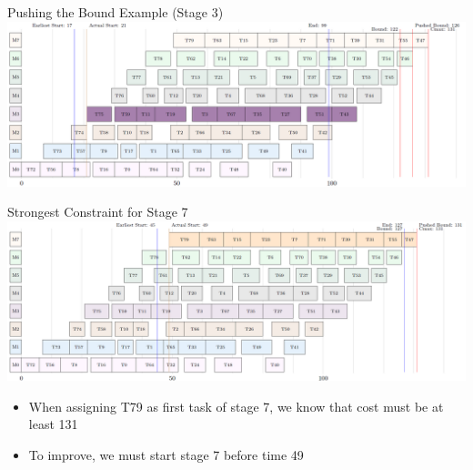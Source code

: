 \documentclass[dvipsnames,aspectratio=169]{beamer}
\begin{document}
\begin{frame}{Pushing the Bound Example (Stage 3)}
\includegraphics[width=14cm]{images/flowbound122pushed.PNG}
\end{frame}


\begin{frame}{Strongest Constraint for Stage 7}
\includegraphics[width=14cm]{images/flowbound127pushed.PNG}
\begin{itemize}
    \item When assigning T79 as first task of stage 7, we know that cost must be at least 131
    \item To improve, we must start stage 7 before time 49
\end{itemize}
\end{frame}

\end{document}
